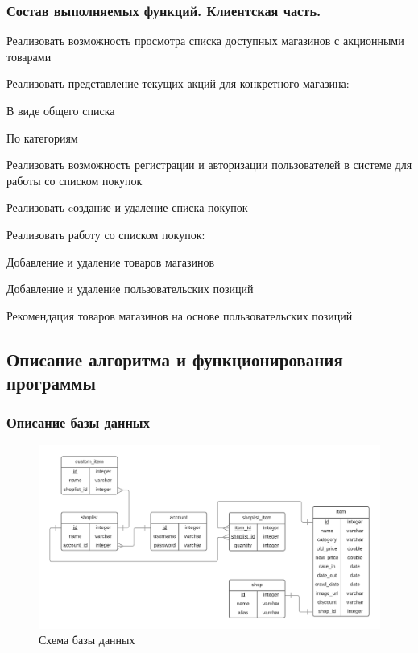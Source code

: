 \subsubsection{Состав выполняемых функций. Клиентская часть.}
\begin{my_enumerate}
  \item Реализовать возможность просмотра списка доступных магазинов с акционными товарами
  \item Реализовать представление текущих акций для конкретного магазина:
    \begin{my_enumerate}
      \item В виде общего списка
      \item По категориям
    \end{my_enumerate}
  \item Реализовать возможность регистрации и авторизации пользователей в системе для
    работы со списком покупок
  \item Реализовать cоздание и удаление списка покупок
  \item Реализовать работу со списком покупок:
    \begin{my_enumerate}
      \item Добавление и удаление товаров магазинов
      \item Добавление и удаление пользовательских позиций
      \item Рекомендация товаров магазинов на основе пользовательских позиций 
    \end{my_enumerate}
\end{my_enumerate}

\subsection{Описание алгоритма и функционирования программы}

\subsubsection{Описание базы данных}
\begin{figure}[H]
    \centering
    \includegraphics[width=\textwidth]{./pics/database.png}
    \caption{\small{Схема базы данных}}
    \label{database}
\end{figure}

